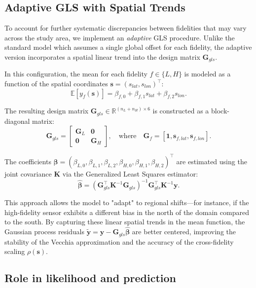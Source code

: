 \documentclass[12pt]{article}
\begin{document}
\subsection*{Adaptive GLS with Spatial Trends}

To account for further systematic discrepancies between fidelities that may vary across the study area, we implement an \textit{adaptive} GLS procedure. Unlike the standard model which assumes a single global offset for each fidelity, the adaptive version incorporates a spatial linear trend into the design matrix $\bm{G}_{gls}$.

In this configuration, the mean for each fidelity $f \in \{L, H\}$ is modeled as a function of the spatial coordinates $\bm{s} = (s_{lat}, s_{lon})^\top$:
\[
\mathbb{E}[y_f(\bm{s})] = \beta_{f,0} + \beta_{f,1} s_{lat} + \beta_{f,2} s_{lon}.
\]

The resulting design matrix $\bm{G}_{gls} \in \mathbb{R}^{(n_L+n_H) \times 6}$ is constructed as a block-diagonal matrix:
\[
\bm{G}_{gls} = \begin{bmatrix} \bm{G}_L & \bm{0} \\ \bm{0} & \bm{G}_H \end{bmatrix}, \quad \text{where} \quad \bm{G}_f = [\bm{1}, \bm{s}_{f,lat}, \bm{s}_{f,lon}].
\]

The coefficients $\boldsymbol{\beta} = (\beta_{L,0}, \beta_{L,1}, \beta_{L,2}, \beta_{H,0}, \beta_{H,1}, \beta_{H,2})^\top$ are estimated using the joint covariance $\bm{K}$ via the Generalized Least Squares estimator:
\[
\hat{\boldsymbol{\beta}} = (\bm{G}_{gls}^\top \bm{K}^{-1} \bm{G}_{gls})^{-1} \bm{G}_{gls}^\top \bm{K}^{-1} \bm{y}.
\]

This approach allows the model to "adapt" to regional shifts—for instance, if the high-fidelity sensor exhibits a different bias in the north of the domain compared to the south. By capturing these linear spatial trends in the mean function, the Gaussian process residuals $\tilde{\bm{y}} = \bm{y} - \bm{G}_{gls}\hat{\boldsymbol{\beta}}$ are better centered, improving the stability of the Vecchia approximation and the accuracy of the cross-fidelity scaling $\rho(\bm{s})$.



\subsection*{Role in likelihood and prediction}
\end{document}
